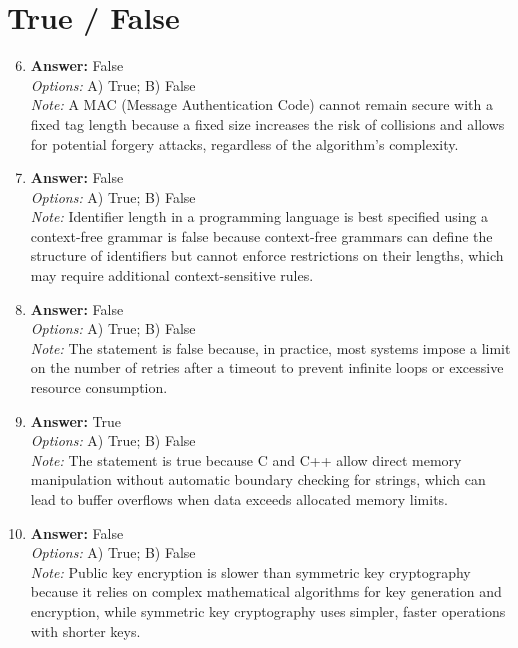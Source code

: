 \documentclass[12pt]{article}
\begin{document}
\section*{True / False}
\begin{enumerate}[label=\arabic*.]
\setcounter{enumi}{5}
\item \textbf{Answer:} False
\\ \textit{Options:} A) True; B) False
\\ \textit{Note:} A MAC (Message Authentication Code) cannot remain secure with a fixed tag length because a fixed size increases the risk of collisions and allows for potential forgery attacks, regardless of the algorithm's complexity.
\item \textbf{Answer:} False
\\ \textit{Options:} A) True; B) False
\\ \textit{Note:} Identifier length in a programming language is best specified using a context-free grammar is false because context-free grammars can define the structure of identifiers but cannot enforce restrictions on their lengths, which may require additional context-sensitive rules.
\item \textbf{Answer:} False
\\ \textit{Options:} A) True; B) False
\\ \textit{Note:} The statement is false because, in practice, most systems impose a limit on the number of retries after a timeout to prevent infinite loops or excessive resource consumption.
\item \textbf{Answer:} True
\\ \textit{Options:} A) True; B) False
\\ \textit{Note:} The statement is true because C and C++ allow direct memory manipulation without automatic boundary checking for strings, which can lead to buffer overflows when data exceeds allocated memory limits.
\item \textbf{Answer:} False
\\ \textit{Options:} A) True; B) False
\\ \textit{Note:} Public key encryption is slower than symmetric key cryptography because it relies on complex mathematical algorithms for key generation and encryption, while symmetric key cryptography uses simpler, faster operations with shorter keys.
\end{enumerate}
\end{document}
